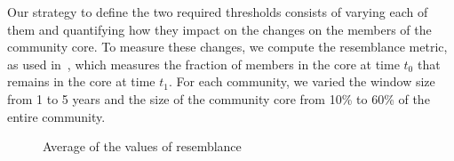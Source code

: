 \documentclass[letterpaper]{www13-companion-accepted}
\begin{document}
Our strategy to define the two required thresholds consists of varying each of them and quantifying how they impact on the changes on the members of the community core. To measure these
changes, we compute the resemblance metric, as used in~\cite{Viswanath:2009}, which measures the fraction of members in the core at time $t_0$ that remains in the core at time $t_1$. 
For each community, we varied the window size from 1 to 5 years and the size of the community core from 10\% to 60\% of the entire community.


\begin{figure}[!htb]
  \vspace{-0.3cm}
  \begin{center}
  \end{center}
\vspace{-0.5cm}
\caption{Average of the values of resemblance}
 \label{fig:averange_values_resemblance}
\end{figure}
\end{document}

